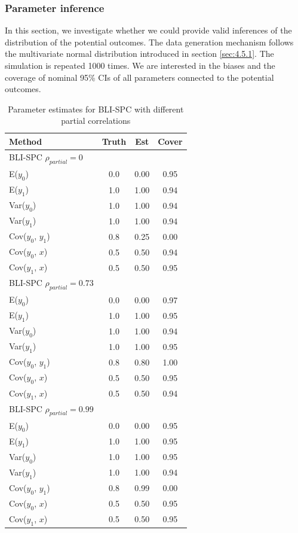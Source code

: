 	\subsubsection{Parameter inference}
	In this section, we investigate whether we could provide valid inferences of the distribution of the potential outcomes. The data generation mechanism follows the multivariate normal distribution introduced in section \ref{sec:4.5.1}. The simulation is repeated 1000 times. We are interested in the biases and the coverage of nominal 95\% CIs of all parameters connected to the potential outcomes.  
	\begin{table}[ht!]
		\centering
		\begin{tabular}{lccc}
			Method & Truth & Est   & Cover \\
			\hline
			BLI-SPC $\rho_{partial} = 0$       &      &      &  \\\hline
			E($y_0$)       & 0.0     & 0.00     & 0.95 \\
			E($y_1$)       & 1.0     & 1.00     & 0.94 \\
			Var($y_0$)     & 1.0     & 1.00 & 0.94 \\
			Var($y_1$)     & 1.0     & 1.00 & 0.94 \\
			Cov($y_0$, $y_1$) & 0.8   & 0.25   & 0.00 \\
			Cov($y_0$, $x$)  & 0.5   & 0.50 & 0.94 \\
			Cov($y_1$, $x$)  & 0.5   & 0.50   & 0.95\\\hline
			BLI-SPC $\rho_{partial} = 0.73$       &      &      &  \\\hline
			E($y_0$)       & 0.0     & 0.00     & 0.97 \\
			E($y_1$)       & 1.0     & 1.00     & 0.95 \\
			Var($y_0$)     & 1.0     & 1.00 & 0.94 \\
			Var($y_1$)     & 1.0     & 1.00 & 0.95 \\
			Cov($y_0$, $y_1$) & 0.8   & 0.80   & 1.00 \\
			Cov($y_0$, $x$)  & 0.5   & 0.50 & 0.95 \\
			Cov($y_1$, $x$)  & 0.5   & 0.50   & 0.94\\\hline
			BLI-SPC $\rho_{partial} = 0.99$       &      &      &  \\\hline
			E($y_0$)       & 0.0     & 0.00     & 0.95 \\
			E($y_1$)       & 1.0     & 1.00     & 0.95 \\
			Var($y_0$)     & 1.0     & 1.00 & 0.95 \\
			Var($y_1$)     & 1.0     & 1.00 & 0.94 \\
			Cov($y_0$, $y_1$) & 0.8   & 0.99   & 0.00 \\
			Cov($y_0$, $x$)  & 0.5   & 0.50 & 0.95 \\
			Cov($y_1$, $x$)  & 0.5   & 0.50   & 0.95
		\end{tabular}
		\caption{Parameter estimates for BLI-SPC with different partial correlations}
		\label{tab4_2}
	\end{table} 
